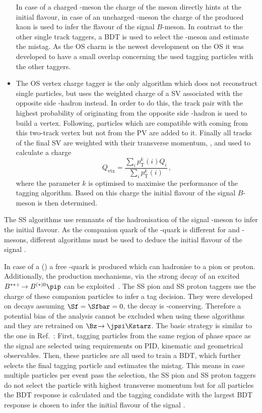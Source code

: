 \begin{itemize}
    In case of a charged \D-meson the charge of the meson directly hints at the initial flavour, in case of an uncharged \D-meson the charge of the produced kaon is used to infer the flavour of the signal $B$-meson.
    In contrast to the other single track taggers, a \ac{BDT} is used to select the \D-meson and estimate the mistag.
    As the OS charm is the newest development on the OS it was developed to have a small overlap concerning the used tagging particles with the other taggers.
    \item The OS vertex charge tagger is the only algorithm which does not reconstruct single particles, but uses the weighted charge of a \ac{SV} associated with the opposite side \bquark-hadron instead.
    In order to do this, the track pair with the highest probability of originating from the opposite side \bquark-hadron is used to build a vertex.
    Following, particles which are compatible with coming from this two-track vertex but not from the \ac{PV} are added to it.
    Finally all tracks of the final \ac{SV} are weighted with their transverse momentum, \pt, and used to calculate a charge
    \begin{equation}
    Q_{\text{vtx}}=\frac{\sum_{i}p_{\mathrm T}^k(i)Q_i}{\sum_{i}p_{\mathrm T}^k(i)}\,,
    \end{equation}
    where the parameter $k$ is optimised to maximise the performance of the tagging algorithm.
    Based on this charge the initial flavour of the signal $B$-meson is then determined.
\end{itemize}

The SS algorithms use remnants of the hadronisation of the signal \B-meson to infer the initial flavour.
As the companion quark of the \bquark-quark is different for \Bz and \Bs-mesons, different algorithms must be used to deduce the initial flavour of the signal \B.

In case of a \Bz (\bquarkbar\dquark) a free \dquarkbar-quark is produced which can hadronise to a pion or proton.
Additionally, the production mechanisms, \eg via the strong decay of an excited $B^{**+}\!\to B^{(*)0}\pip$ can be exploited~\cite{Aaij:2016rdg}.
The SS pion and SS proton taggers use the charge of these companion particles to infer a tag decision.
They were developed on \BdToDpi decays assuming $\Sf=\Sfbar=0$, \ie the decay \BdToDpi is \CP-conserving.
Therefore a potential bias of the analysis cannot be excluded when using these algorithms and they are retrained on $\Bz\!\to\jpsi\Kstarz$.
The basic strategy is similar to the one in Ref.~\cite{Aaij:2016rdg}:
First, tagging particles from the same region of phase space as the signal \B are selected using requirements on PID, kinematic and geometrical observables.
Then, these particles are all used to train a \ac{BDT}, which further selects the final tagging particle and estimates the mistag.
This means in case multiple particles per event pass the selection, the SS pion and SS proton taggers do not select the particle with highest transverse momentum but for all particles the \ac{BDT} response is calculated and the tagging candidate with the largest \ac{BDT} response is chosen to infer the initial flavour of the signal \B.

